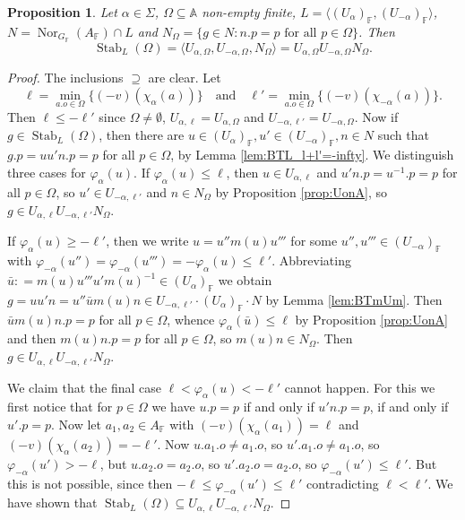 \documentclass[12pt]{amsart}
\newcommand{\F}{\mathbb{F} }
\newcommand{\A}{\mathbb{A}}
\numberwithin{equation}{section}
\newtheorem{proposition}[theorem]{Proposition}
\theoremstyle{remark} %
\begin{document}
		\begin{proposition}\label{prop:stab_L_Omega}
			Let $\alpha \in \Sigma$, $\Omega \subseteq \A$ non-empty finite, $L = \langle (U_{\alpha})_\F , (U_{-\alpha})_\F \rangle$, $N  = \operatorname{Nor}_{G_\F}(A_\F) \cap L$ and $N_\Omega = \{g \in N \colon n.p = p \text{ for all } p \in \Omega\}$. Then
			$$
			\operatorname{Stab}_{L} (\Omega) = \langle U_{\alpha,\Omega} , U_{-\alpha,\Omega} , N_\Omega \rangle =  U_{\alpha, \Omega} U_{-\alpha,\Omega} N_\Omega.
			$$
		\end{proposition}
		\begin{proof}
			The inclusions $\supseteq$ are clear. Let 
			$$
			\ell = \min_{a.o \in \Omega} \{ (-v)(\chi_\alpha(a)) \} \quad \text{and} \quad \ell' = \min_{a.o \in \Omega} \{ (-v)(\chi_{-\alpha}(a)) \}.
			$$
			Then $\ell \leq -\ell'$ since $\Omega \neq \emptyset$, $U_{\alpha,\ell} = U_{\alpha,\Omega}$ and $U_{-\alpha, \ell'} = U_{-\alpha,\Omega}$. Now if $g\in \operatorname{Stab}_L(\Omega)$, then there are $u\in (U_\alpha)_\F , u' \in (U_{-\alpha})_\F , n \in N$ such that $g.p = uu'n.p = p$ for all $p\in \Omega$, by Lemma \ref{lem:BTL_l+l'=-infty}. We distinguish three cases for $\varphi_\alpha(u)$. If $\varphi_{\alpha}(u) \leq \ell$, then $u \in U_{\alpha,\ell}$ and $u'n.p = u^{-1}.p = p$ for all $p \in \Omega$, so $u' \in U_{-\alpha, \ell'}$ and $n\in N_\Omega$ by Proposition \ref{prop:UonA}, so $g \in U_{\alpha,\ell} U_{-\alpha,\ell'} N_{\Omega}$.
			
			If $\varphi_\alpha(u) \geq -\ell'$, then we write $u = u'' m(u) u''' $ for some $u'',u''' \in (U_{-\alpha})_\F $ with $\varphi_{-\alpha}(u'') = \varphi_{-\alpha}(u''') = -\varphi_\alpha(u) \leq \ell'$. Abbreviating $\bar{u}: = m(u) u'''u' m(u)^{-1} \in (U_{\alpha})_\F $ we obtain
			$g = uu'n = u'' \bar{u} m(u) n \in U_{-\alpha,\ell'} \cdot (U_{\alpha})_\F  \cdot N$ by Lemma \ref{lem:BTmUm}. Then $\bar{u}m(u)n.p = p$ for all $p \in \Omega$, whence $\varphi_{\alpha}(\bar{u}) \leq \ell$ by Proposition \ref{prop:UonA} and then $m(u)n.p = p$ for all $p\in \Omega$, so $m(u)n \in N_\Omega$. Then $g \in U_{\alpha,\ell}  U_{-\alpha,\ell'} N_\Omega$.
			
			We claim that the final case $\ell < \varphi_\alpha(u) < -\ell'$ cannot happen. For this we first notice that for $p\in \Omega$ we have $u.p = p$ if and only if $u'n.p = p$, if and only if $u'.p = p$. Now let $a_1,a_2 \in A_\F$ with $(-v)(\chi_\alpha(a_1)) = \ell$ and $(-v)(\chi_{\alpha}(a_2)) = -\ell'$. Now $u.a_1.o \neq a_1.o$, so $u'.a_1.o \neq a_1.o$, so $\varphi_{-\alpha}(u') > -\ell$, but $u.a_2.o = a_2.o$, so $u'.a_2.o = a_2.o$, so $\varphi_{-\alpha}(u')\leq \ell'$. But this is not possible, since then $-\ell \leq \varphi_{-\alpha}(u') \leq \ell'$ contradicting $\ell < \ell'$.
			We have shown that $\operatorname{Stab}_{L}(\Omega) \subseteq U_{\alpha,\ell} U_{-\alpha,\ell'} N_{\Omega}$.  
		\end{proof}
		
\end{document}
